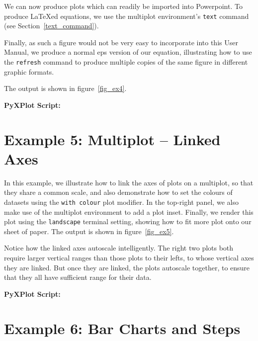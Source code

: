 \documentclass[a4paper,onecolumn,11pt]{book}
\begin{document}
We can now produce plots which can readily be imported into Powerpoint. To
produce \LaTeX ed equations, we use the multiplot environment's \texttt{text}
command (see Section~\ref{text_command}).

Finally, as such a figure would not be very easy to incorporate into this User
Manual, we produce a normal eps version of our equation, illustrating how to
use the \texttt{refresh} command to produce multiple copies of the same figure
in different graphic formats.

The output is shown in figure~\ref{fig_ex4}.

\vspace{1cm}
\noindent \textbf{PyXPlot Script:}


\newpage
\section{Example 5: Multiplot -- Linked Axes}

 In this example, we illustrate how to link the
axes of plots on a multiplot, so that they share a common scale, and also
demonstrate how to set the colours of datasets using the \texttt{with
colour} plot modifier. In the top-right
panel, we also make use of the multiplot environment to add a plot
inset. Finally, we render this plot using the
\texttt{landscape} terminal setting, showing how
to fit more plot onto our sheet of paper. The output is shown in
figure~\ref{fig_ex5}.

Notice how the linked axes autoscale intelligently. The right two plots both
require larger vertical ranges than those plots to their lefts, to whose
vertical axes they are linked. But once they are linked, the plots autoscale
together, to ensure that they all have sufficient range for their data.

\vspace{1cm}
\noindent \textbf{PyXPlot Script:}


\newpage
\section{Example 6: Bar Charts and Steps}
\end{document}
